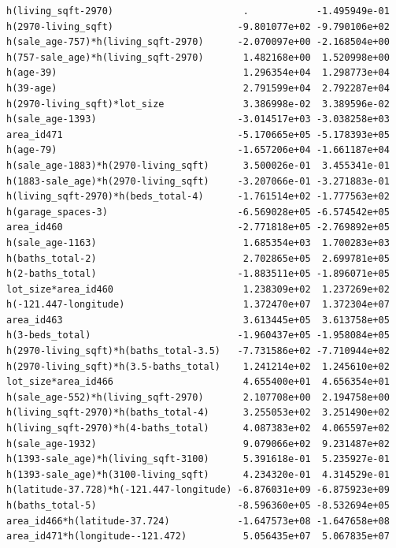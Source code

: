 \documentclass[
]{article}
\begin{document}
\begin{verbatim}
h(living_sqft-2970)                       .            -1.495949e-01
h(2970-living_sqft)                      -9.801077e+02 -9.790106e+02
h(sale_age-757)*h(living_sqft-2970)      -2.070097e+00 -2.168504e+00
h(757-sale_age)*h(living_sqft-2970)       1.482168e+00  1.520998e+00
h(age-39)                                 1.296354e+04  1.298773e+04
h(39-age)                                 2.791599e+04  2.792287e+04
h(2970-living_sqft)*lot_size              3.386998e-02  3.389596e-02
h(sale_age-1393)                         -3.014517e+03 -3.038258e+03
area_id471                               -5.170665e+05 -5.178393e+05
h(age-79)                                -1.657206e+04 -1.661187e+04
h(sale_age-1883)*h(2970-living_sqft)      3.500026e-01  3.455341e-01
h(1883-sale_age)*h(2970-living_sqft)     -3.207066e-01 -3.271883e-01
h(living_sqft-2970)*h(beds_total-4)      -1.761514e+02 -1.777563e+02
h(garage_spaces-3)                       -6.569028e+05 -6.574542e+05
area_id460                               -2.771818e+05 -2.769892e+05
h(sale_age-1163)                          1.685354e+03  1.700283e+03
h(baths_total-2)                          2.702865e+05  2.699781e+05
h(2-baths_total)                         -1.883511e+05 -1.896071e+05
lot_size*area_id460                       1.238309e+02  1.237269e+02
h(-121.447-longitude)                     1.372470e+07  1.372304e+07
area_id463                                3.613445e+05  3.613758e+05
h(3-beds_total)                          -1.960437e+05 -1.958084e+05
h(2970-living_sqft)*h(baths_total-3.5)   -7.731586e+02 -7.710944e+02
h(2970-living_sqft)*h(3.5-baths_total)    1.241214e+02  1.245610e+02
lot_size*area_id466                       4.655400e+01  4.656354e+01
h(sale_age-552)*h(living_sqft-2970)       2.107708e+00  2.194758e+00
h(living_sqft-2970)*h(baths_total-4)      3.255053e+02  3.251490e+02
h(living_sqft-2970)*h(4-baths_total)      4.087383e+02  4.065597e+02
h(sale_age-1932)                          9.079066e+02  9.231487e+02
h(1393-sale_age)*h(living_sqft-3100)      5.391618e-01  5.235927e-01
h(1393-sale_age)*h(3100-living_sqft)      4.234320e-01  4.314529e-01
h(latitude-37.728)*h(-121.447-longitude) -6.876031e+09 -6.875923e+09
h(baths_total-5)                         -8.596360e+05 -8.532694e+05
area_id466*h(latitude-37.724)            -1.647573e+08 -1.647658e+08
area_id471*h(longitude--121.472)          5.056435e+07  5.067835e+07
                                                                    

\end{verbatim}
\end{document}
